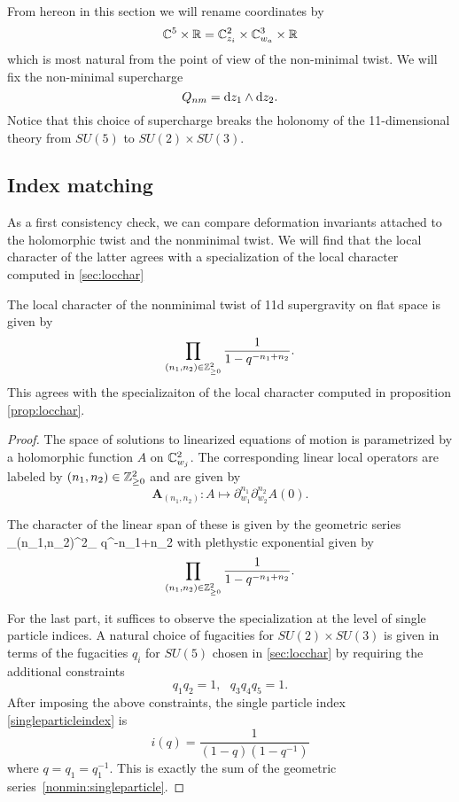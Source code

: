 From hereon in this section we will rename coordinates by
\[
\mathbb C^5 \times \mathbb R = \mathbb C^2_{z_i} \times \mathbb C^3_{w_a} \times \mathbb R
\]
which is most natural from the point of view of the non-minimal twist. 
We will fix the non-minimal supercharge 
\[
Q_{nm} = {\rm d} z_1 \wedge {\rm d} z_2 .
\]
Notice that this choice of supercharge breaks the holonomy of the 11-dimensional theory from $SU(5)$ to $SU(2) \times SU(3)$. 

\subsection{Index matching}
\label{sec:indexcheck}

As a first consistency check, we can compare deformation invariants attached to the holomorphic twist and the nonminimal twist. We will find that the local character of the latter agrees with a specialization of the local character computed in \ref{sec:locchar}

\begin{prop}
The  local character of the nonminimal twist of 11d supergravity on flat space is given by
\[
\prod _{(n_1,n_2)\in \mathbb{Z}^2_{\geq 0}} \frac{1}{1-q^{-n_1+n_2}}.
\] 
This agrees with the specializaiton of the local character computed in proposition \ref{prop:locchar}.
\end{prop}
\begin{proof}
The space of solutions to linearized equations of motion is parametrized by a holomorphic function $A$ on $\mathbb{C}^2_{w_j}$. The corresponding linear local operators are labeled by $(n_1,n_2)\in \mathbb{Z}^2_{\geq 0}$  and are given by 
\[
\boldsymbol{A}_{(n_1,n_2)} : A \mapsto \partial_{w_1}^{n_1}\partial_{w_2}^{n_2} A (0).
\]

The character of the linear span of these is given by the geometric series
\beqn\label{nonmin:singleparticle}
\sum _{(n_1,n_2)\in \Z^2_{}} q^{-n_1+n_2}
\eeqn
with plethystic exponential given by 
\[
\prod _{(n_1,n_2)\in \mathbb{Z}^2_{\geq 0}} \frac{1}{1-q^{-n_1+n_2}}.
\]

For the last part, it suffices to observe the specialization at the level of single particle indices. A natural choice of fugacities for $SU(2)\times SU(3)$ is given in terms of the fugacities $q_i$ for $SU(5)$ chosen in \ref{sec:locchar} by requiring the additional constraints \[q_1q_2 = 1, \ \ \ q_3q_4q_5=1.\]
After imposing the above constraints, the single particle index \ref{singleparticleindex} is
\[
i(q) = \frac{1}{(1-q)(1-q^{-1})}
\]
where $q = q_1=q_1^{-1}$. This is exactly the sum of the geometric series~\eqref{nonmin:singleparticle}.
\end{proof}

